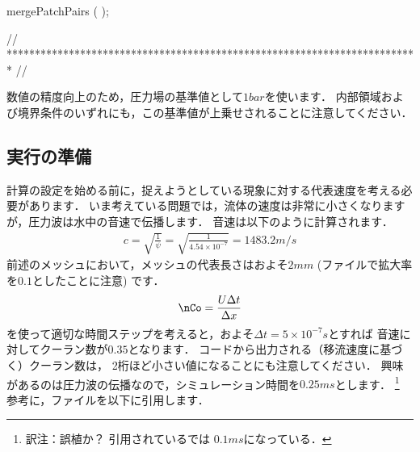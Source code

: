 \begin{OFverbatim}
mergePatchPairs
(
);

// ************************************************************************* //
\end{OFverbatim}
数値の精度向上のため，圧力場の基準値として$1\unit{bar}$を使います．
内部領域および境界条件のいずれにも，この基準値が上乗せされることに注意してください．


\subsection{実行の準備}
\label{ssec:3.4.3}
計算の設定を始める前に，捉えようとしている現象に対する代表速度を考える必要があります．
いま考えている問題では，流体の速度は非常に小さくなりますが，圧力波は水中の音速で伝播します．
音速は以下のように計算されます．
\begin{align}
 \label{eq:3.17}
 c = \sqrt{\frac{1}{\psi}}
 = \sqrt{\frac{1}{4.54 \times 10^{-7}}}
 = 1483.2 \unit{m/s}
\end{align}
前述のメッシュにおいて，メッシュの代表長さはおよそ$2 \unit{mm}$
(ファイルで拡大率を$0.1$としたことに注意) です．
\begin{align}
 \label{eq:3.18}
 \nCo = \frac{U\Delta t}{\Delta x}
\end{align}
を使って適切な時間ステップを考えると，およそ$\Delta t = 5 \times 10^{-7} \unit{s}$とすれば
音速に対してクーラン数が$0.35$となります．
コードから出力される（移流速度に基づく）クーラン数は，
2桁ほど小さい値になることにも注意してください．
興味があるのは圧力波の伝播なので，シミュレーション時間を$0.25 \unit{ms}$とします．%
\footnote{訳注：誤植か？ 引用されているでは
$0.1 \unit{ms}$になっている．}%
参考に，ファイルを以下に引用します．
